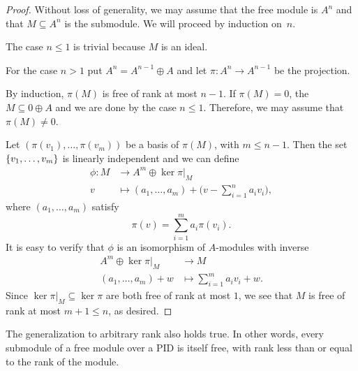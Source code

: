 \begin{proof}
    Without loss of generality, we may assume that the free module is $A^n$ and that $M\subseteq A^n$ is the submodule. We will proceed by induction on~$n$.

    The case $n\le1$ is trivial because $M$ is an ideal.

    For the case $n>1$ put $A^n=A^{n-1}\oplus A$ and let $\pi\colon A^n\to A^{n-1}$ be the projection.

    By induction, $\pi(M)$ is free of rank at most $n-1$. If $\pi(M)=0$, the $M\subseteq 0\oplus A$ and we are done by the case $n\le1$. Therefore, we may assume that $\pi(M)\ne0$.
    
    Let $(\pi(v_1),\dots,\pi(v_m))$ be a basis of $\pi(M)$, with $m\le n-1$. Then the set $\{v_1,\dots,v_m\}$ is linearly independent and we can define
    \begin{align*}
        \phi\colon M&\to A^m\oplus\ker\pi|_M\\
        v&\mapsto (a_1,\dots,a_m)
            +\Big(v-\sum_{i=1}^na_iv_i\Big),
    \end{align*}
    where $(a_1,\dots,a_m)$ satisfy
    $$
        \pi(v)=\sum_{i=1}^ma_i\pi(v_i).
    $$
    It is easy to verify that $\phi$ is an isomorphism of $A$-modules with inverse
    \begin{align*}
        A^m\oplus\ker\pi|_M&\to M\\
        (a_1,\dots,a_m)+w&\mapsto\sum_{i=1}^ma_iv_i+w.
    \end{align*}
    Since $\ker\pi|_M\subseteq\ker\pi$ are both free of rank at most $1$, we see that $M$ is free of rank at most $m+1\le n$, as desired.
\end{proof}

\small
    \begin{thm}\label{thm:pid-submodule-of-free-is-free-general}
        The generalization to arbitrary rank also holds true. In other words, every submodule of a free module over a PID is itself free, with rank less than or equal to the rank of the module.
    \end{thm}


